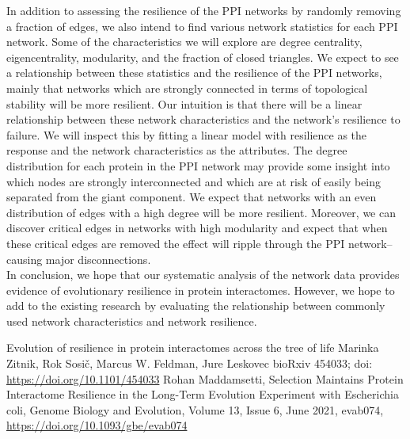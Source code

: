 \documentclass[12pt]{article}
\begin{document}
\indent In addition to assessing the resilience of the PPI networks by randomly removing a fraction of edges, we also intend to find various network statistics for each PPI network. Some of the characteristics we will explore are degree centrality, eigencentrality, modularity, and the fraction of closed triangles. We expect to see a relationship between these statistics and the resilience of the PPI networks, mainly that networks which are strongly connected in terms of topological stability will be more resilient. Our intuition is that there will be a linear relationship between these network characteristics and the network's resilience to failure. We will inspect this by fitting a linear model with resilience as the response and the network characteristics as the attributes. The degree distribution for each protein in the PPI network may provide some insight into which nodes are strongly interconnected and which are at risk of easily being separated from the giant component. We expect that networks with an even distribution of edges with a high degree will be more resilient. Moreover, we can discover critical edges in networks with high modularity and expect that when these critical edges are removed the effect will ripple through the PPI network--causing major disconnections. \\
\indent In conclusion, we hope that our systematic analysis of the network data provides evidence of evolutionary resilience in protein interactomes. However, we hope to add to the existing research by evaluating the relationship between commonly used network characteristics and network resilience. 

\begin{thebibliography}{1}
  Evolution of resilience in protein interactomes across the tree of life
Marinka Zitnik, Rok Sosič, Marcus W. Feldman, Jure Leskovec
bioRxiv 454033; doi: \url{https://doi.org/10.1101/454033}
 Rohan Maddamsetti, Selection Maintains Protein Interactome Resilience in the Long-Term Evolution Experiment with Escherichia coli, Genome Biology and Evolution, Volume 13, Issue 6, June 2021, evab074, \url{https://doi.org/10.1093/gbe/evab074}
  \end{thebibliography}

\end{document}
